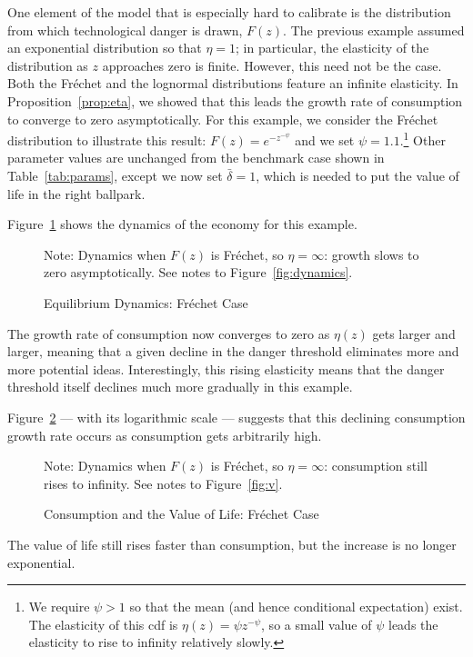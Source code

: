 \documentclass[12pt,twoside]{article}
\newcommand{\fignote}[2]{\begin{center}\parbox[c]{#1}{\footnotesize #2} \end{center}}
\begin{document}
One element of the model that is especially hard to calibrate is the
distribution from which technological danger is drawn, $F(z)$. The
previous example assumed an exponential distribution so that $\eta=1$;
in particular, the elasticity of the distribution as $z$ approaches zero
is finite. However, this need not be the case. Both the Fr\'{e}chet and
the lognormal distributions feature an infinite elasticity. In
Proposition~\ref{prop:eta}, we showed that this leads the growth rate of
consumption to converge to zero asymptotically. For this example, we
consider the Fr\'{e}chet distribution to illustrate this result:
$F(z)=e^{-z^{-\psi}}$ and we set $\psi=1.1$.\footnote{We require
  $\psi>1$ so that the mean (and hence conditional expectation) exist.
  The elasticity of this cdf is $\eta(z)=\psi z^{-\psi}$, so a small
  value of $\psi$ leads the elasticity to rise to infinity relatively
  slowly.} Other parameter values are unchanged from the benchmark case
shown in Table~\ref{tab:params}, except we now set $\bar{\delta}=1$,
which is needed to put the value of life in the right ballpark.

Figure~\ref{fig:dynFrech} shows the dynamics of the economy for this example.
\begin{figure}[tp]
\caption{Equilibrium Dynamics: Fr\'{e}chet Case}
\label{fig:dynFrech}
  \fignote{4.5in}{Note: Dynamics when $F(z)$ is Fr\'{e}chet, so
    $\eta=\infty$: growth slows to zero asymptotically. See notes to
    Figure~\ref{fig:dynamics}.}
\end{figure} 
The growth rate of consumption now converges to zero as $\eta(z)$ gets
larger and larger, meaning that a given decline in the danger threshold
eliminates more and more potential ideas. Interestingly, this rising
elasticity means that the danger threshold itself declines much more
gradually in this example.

Figure~\ref{fig:vFrech} --- with its logarithmic scale --- suggests that
this declining consumption growth rate occurs as consumption gets
arbitrarily high.
\begin{figure}[tp]
\caption{Consumption and the Value of Life: Fr\'{e}chet Case}
\label{fig:vFrech}
\fignote{4.5in}{Note: Dynamics when $F(z)$ is Fr\'{e}chet, so
    $\eta=\infty$: consumption still rises to infinity. See notes to
    Figure~\ref{fig:v}.}
\end{figure} 
The value of life still rises faster than consumption, but the increase
is no longer exponential.
\end{document}

